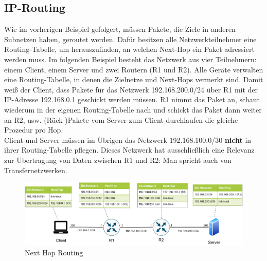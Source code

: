 \subsection{IP-Routing}

Wie im vorherigen Beispiel gefolgert, müssen Pakete, die Ziele in anderen Subnetzen haben, geroutet werden. Dafür besitzen alle Netzwerkteilnehmer eine Routing-Tabelle, um herauszufinden, an welchen \glqq Next-Hop\grqq{} ein Paket adressiert werden muss. Im folgenden Beispiel besteht das Netzwerk aus vier Teilnehmern: einem Client, einem Server und zwei Routern (R1 und R2). Alle Geräte verwalten eine Routing-Tabelle, in denen die Zielnetze und Next-Hops vermerkt sind.
Damit weiß der Client, dass Pakete für das Netzwerk 192.168.200.0/24 über R1 mit der IP-Adresse 192.168.0.1 geschickt werden müssen. R1 nimmt das Paket an, schaut wiederum in der eigenen Routing-Tabelle nach und schickt das Paket dann weiter an R2, usw. (Rück-)Pakete vom Server zum Client durchlaufen die gleiche Prozedur pro Hop.\\
Client und Server müssen im Übrigen das Netzwerk 192.168.100.0/30 \textbf{nicht} in ihrer Routing-Tabelle pflegen. Dieses Netzwerk hat ausschließlich eine Relevanz zur Übertragung von Daten zwischen R1 und R2: Man spricht auch von Transfernetzwerken.\\

\begin{figure}[h]
  \centering
  \includegraphics{Figures/next_hop_routing_specific_table.pdf}
  \caption{Next Hop Routing}
  \label{grafik: next_hop_routing}
\end{figure}

